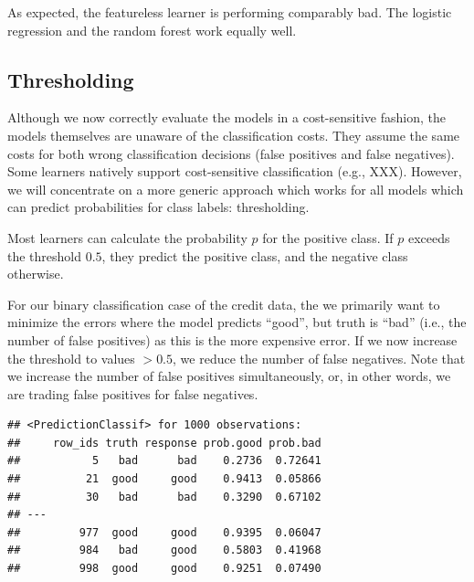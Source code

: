 \documentclass[
]{scrbook}
\newenvironment{Shaded}{\begin{snugshade}}{\end{snugshade}}
\newcommand{\AttributeTok}[1]{\textcolor[rgb]{0.77,0.63,0.00}{#1}}
\newcommand{\CommentTok}[1]{\textcolor[rgb]{0.56,0.35,0.01}{\textit{#1}}}
\newcommand{\FunctionTok}[1]{\textcolor[rgb]{0.00,0.00,0.00}{#1}}
\newcommand{\NormalTok}[1]{#1}
\newcommand{\OtherTok}[1]{\textcolor[rgb]{0.56,0.35,0.01}{#1}}
\newcommand{\SpecialCharTok}[1]{\textcolor[rgb]{0.00,0.00,0.00}{#1}}
\newcommand{\StringTok}[1]{\textcolor[rgb]{0.31,0.60,0.02}{#1}}
\renewenvironment{Shaded} {\begin{snugshade}\small} {\end{snugshade}}
\begin{document}
As expected, the featureless learner is performing comparably bad.
The logistic regression and the random forest work equally well.

\hypertarget{thresholding}{%
\subsection{Thresholding}\label{thresholding}}

Although we now correctly evaluate the models in a cost-sensitive fashion, the models themselves are unaware of the classification costs.
They assume the same costs for both wrong classification decisions (false positives and false negatives).
Some learners natively support cost-sensitive classification (e.g., XXX).
However, we will concentrate on a more generic approach which works for all models which can predict probabilities for class labels: thresholding.

Most learners can calculate the probability \(p\) for the positive class.
If \(p\) exceeds the threshold \(0.5\), they predict the positive class, and the negative class otherwise.

For our binary classification case of the credit data, the we primarily want to minimize the errors where the model predicts ``good'', but truth is ``bad'' (i.e., the number of false positives) as this is the more expensive error.
If we now increase the threshold to values \(> 0.5\), we reduce the number of false negatives.
Note that we increase the number of false positives simultaneously, or, in other words, we are trading false positives for false negatives.

\begin{Shaded}
\end{Shaded}

\begin{verbatim}
## <PredictionClassif> for 1000 observations:
##     row_ids truth response prob.good prob.bad
##           5   bad      bad    0.2736  0.72641
##          21  good     good    0.9413  0.05866
##          30   bad      bad    0.3290  0.67102
## ---                                          
##         977  good     good    0.9395  0.06047
##         984   bad     good    0.5803  0.41968
##         998  good     good    0.9251  0.07490
\end{verbatim}
\end{document}
